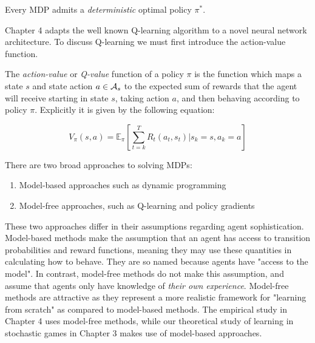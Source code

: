 \begin{thm}
Every MDP admits a {\em deterministic} optimal policy $\pi^*$.
\label{thm:optimaldetpolicy}
\end{thm}

Chapter 4 adapts the well known Q-learning algorithm to a novel neural network architecture. To discuss Q-learning we must first introduce the action-value function.

\begin{mydef}
The {\em action-value} or {\em Q-value} function of a policy $\pi$ is the function which maps a state $s$ and state action $a \in \AA_s$ to the expected sum of rewards that the agent will receive starting in state $s$, taking action $a$, and then behaving according to policy $\pi$. Explicitly it is given by the following equation:

\begin{equation}
V_{\pi}(s, a) = \mathbb{E}_{\pi}\left[\sum_{t=k}^T R_t(a_t,s_t) | s_k = s, a_k = a \right]
\label{eq:qfexpectation}
\end{equation}

\label{mydef:qf}
\end{mydef}



There are two broad approaches to solving MDPs:
\begin{enumerate}
\item Model-based approaches such as dynamic programming
\item Model-free approaches, such as Q-learning and policy gradients
\end{enumerate}

These two approaches differ in their assumptions regarding agent sophistication. Model-based methods make the assumption that an agent has access to transition probabilities and reward functions, meaning they may use these quantities in calculating how to behave. They are so named because agents have "access to the model". In contrast, model-free methods do not make this assumption, and assume that agents only have knowledge of {\em their own experience}. Model-free methods are attractive as they represent a more realistic framework for "learning from scratch" as compared to model-based methods. The empirical study in Chapter 4 uses model-free methods, while our theoretical study of learning in stochastic games in Chapter 3 makes use of model-based approaches.


